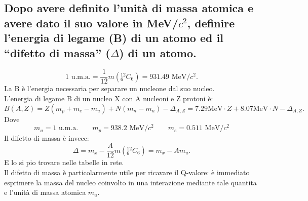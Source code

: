 \subsection[$\ $ Unità di massa atomica, energia di legame B e difetto di massa $\Delta$]{Dopo avere definito l’unità di massa atomica e avere dato il suo valore in MeV/$c^2$, definire l’energia di legame (B) di un atomo ed il “difetto di massa” ($\Delta$) di un atomo.}
\[
	\text{1 u.m.a.} = \frac{1}{12}m\left( {}^{12}_{6}C_{6} \right) = 931.49 \text{ MeV/}c^2 
.\]
La B è l'energia necessaria per separare un nucleone dal suo nucleo.\\
L'energia di legame B di un nucleo X con A nucleoni e Z protoni è:
\[
	B\left( A, Z \right) = Z\left( m_p + m_e - m_u \right) + N \left( m_n - m_u \right) - \Delta_{A, Z} = 7.29 \text{MeV} \cdot Z + 8.07 \text{MeV} \cdot N - \Delta_{A,Z} 
.\] 
Dove 
\[
	m_u = 1 \text{ u.m.a.}\quad \quad 
	m_p = 938.2 \text{ MeV/}c^2\quad \quad 
	m_e = 0.511 \text{ MeV/}c^2
\]
Il difetto di massa è invece:
\[
	\Delta = m_{x} - \frac{A}{12}m\left( {}^{12}_{6}C_{6} \right) = m_x - Am_u 
.\] 
E lo si pio trovare nelle tabelle in rete.\\
Il difetto di massa è particolarmente utile per ricavare il Q-valore: è immediato esprimere la massa del nucleo coinvolto in una interazione mediante tale quantita e l'unità di massa atomica $m_u$.

